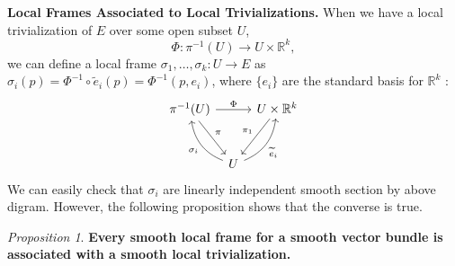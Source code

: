\documentclass[a4paper]{article}
\theoremstyle{remark}
\newtheorem{prop}{Proposition}
\newcommand{\rk}{\mathbb{R}^k} %
\begin{document}
\textbf{Local Frames Associated to Local Trivializations.} When we have a local trivialization of $E$ over some open subset $U$, 
$$
\Phi : \pi^{-1}(U) \to U \times \rk,
$$
we can define a local frame $\sigma_1,\dots,\sigma_k : U \to E$ as $\sigma_i(p) = \Phi^{-1} \circ \widetilde{e}_i (p) = \Phi^{-1}(p,e_i)$, where $\{e_i\}$ are the standard basis for $\rk$ :
\[
\begin{tikzcd}[row sep=large,column sep=tiny]
\pi^{-1}(U) \ar[rr,"\Phi"] \ar[dr,"\pi"] & & U \times \rk \ar[dl,swap,"\pi_1"] \\
& U \ar[ul, bend left=30, "\sigma_i"] \ar[ur, bend right=30, swap, "\widetilde{e}_i"] & 
\end{tikzcd}
\] 
We can easily check that $\sigma_i$ are linearly independent smooth section by above digram. However, the following proposition shows that the converse is true.
\begin{prop}
\textbf{Every smooth local frame for a smooth vector bundle is associated with a smooth local trivialization.} 
\end{prop}
\end{document}
